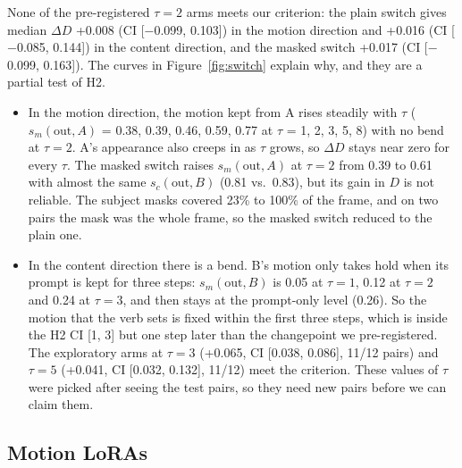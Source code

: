 \documentclass[twoside,english]{article}
\newcommand{\dD}{\Delta D}
\begin{document}
None of the pre-registered $\tau = 2$ arms meets our criterion: the plain switch gives median $\dD$ +0.008
(CI [$-$0.099, 0.103]) in the motion direction and +0.016 (CI [$-$0.085, 0.144]) in the content
direction, and the masked switch +0.017 (CI [$-$0.099, 0.163]). The curves in Figure~\ref{fig:switch}
explain why, and they are a partial test of H2.
\begin{itemize}
\item In the motion direction, the motion kept from A rises steadily with $\tau$ ($s_m(\text{out},A)$ =
  0.38, 0.39, 0.46, 0.59, 0.77 at $\tau$ = 1, 2, 3, 5, 8) with no bend at $\tau = 2$. A's appearance also
  creeps in as $\tau$ grows, so $\dD$ stays near zero for every $\tau$. The masked switch raises
  $s_m(\text{out},A)$ at $\tau = 2$ from 0.39 to 0.61 with almost the same $s_c(\text{out},B)$ (0.81 vs.\
  0.83), but its gain in $D$ is not reliable. The subject masks covered 23\% to 100\% of the frame, and on
  two pairs the mask was the whole frame, so the masked switch reduced to the plain one.
\item In the content direction there is a bend. B's motion only takes hold when its prompt is kept for
  three steps: $s_m(\text{out},B)$ is 0.05 at $\tau = 1$, 0.12 at $\tau = 2$ and 0.24 at $\tau = 3$, and then
  stays at the prompt-only level (0.26). So the motion that the verb sets is fixed within the first three
  steps, which is inside the H2 CI [1, 3] but one step later than the changepoint we pre-registered.
  The exploratory arms at $\tau = 3$ (+0.065, CI [0.038, 0.086], 11/12 pairs) and $\tau = 5$ (+0.041, CI
  [0.032, 0.132], 11/12) meet the criterion. These values of $\tau$ were picked after seeing the test pairs,
  so they need new pairs before we can claim them.
\end{itemize}

\subsection{Motion LoRAs}
\end{document}
